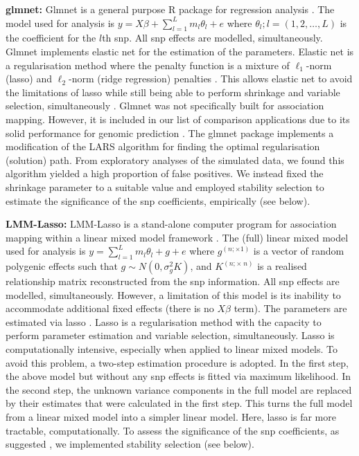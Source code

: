\documentclass{nature}
\begin{document}
\textbf{glmnet:}  Glmnet is a general purpose R package for regression analysis  \cite{Friedman2010glmnet}. 
The model used for analysis is 
$y = X \beta + \sum_{l=1}^L m_l \theta_l + e$ where $\theta_l; l=(1,2, \ldots, L)$ is the coefficient for the $l$th snp. 
All snp effects are modelled, simultaneously. 
Glmnet implements elastic net for the estimation of the parameters. Elastic net is a regularisation method where the 
penalty function is a mixture of 
$\ell_1$-norm (lasso) and $\ell_2$-norm (ridge regression) penalties  \cite{zou2005regularization}. 
This allows elastic net to avoid the limitations of lasso 
while still being able to perform shrinkage and variable selection, simultaneously \cite{zou2005regularization}. 
Glmnet was not specifically built for association mapping. 
However, it is included in our list of comparison applications due to its solid performance for genomic prediction 
\cite{heslot2012genomic,ogutu2012genomic,}.
The glmnet package 
implements a modification of the LARS algorithm \cite{efron2004least} for finding the optimal regularisation (solution) path. 
From exploratory analyses of the simulated data, we found this algorithm yielded a high proportion of false positives. 
We instead fixed the shrinkage parameter to a suitable value 
and employed stability selection to estimate the significance of the snp coefficients, empirically (see below).  



\textbf{LMM-Lasso:} LMM-Lasso is a stand-alone computer program for association mapping within a linear 
mixed model framework \cite{rakitsch2013lasso}. The (full) linear mixed model used for analysis is 
$y =  \sum_{l=1}^L m_l \theta_l +   g  + e$ where $g^{(n ; \times 1)}$ is a vector of random polygenic effects such that 
$g \sim N(0, \sigma^2_g K)$, and $K^{(n ; \times \; n)}$ is a realised relationship matrix reconstructed from the snp information. 
All snp effects are modelled, simultaneously. However, a limitation of this model is its inability to accommodate 
additional fixed effects (there is no $X \beta$ term). 
The parameters are estimated via lasso \cite{Tibshirani1996lasso}. Lasso is a regularisation method with the capacity to perform parameter estimation and variable selection, simultaneously.  
Lasso is computationally intensive, especially when applied to linear mixed models. To avoid this problem, a two-step 
estimation procedure is adopted.  In the first step, the above model but without any snp effects is fitted via 
maximum likelihood. In the second step, the unknown variance components in the full model are replaced by their estimates that were calculated in the first step.  This turns the full model from a linear mixed model into a simpler linear model. Here, lasso is far more tractable, computationally.  To assess the significance of the snp coefficients, as suggested \cite{rakitsch2013lasso}, we implemented stability selection (see below). 
\end{document}
